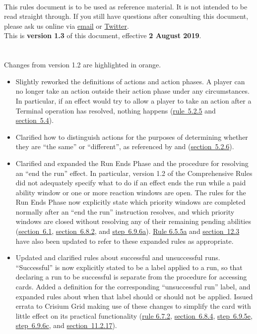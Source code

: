 \newcommand{\HRule}{\rule{\linewidth}{0.2mm}} %

\begin{titlepage}
\\[10pt]
This rules document is to be used as reference material. It is not intended to be read straight through. If you still have questions after consulting this document, please ask us online via \href{mailto:rules@nisei.net}{email} or \href{https://twitter.com/NISEI_Rules}{Twitter}.\\[10pt]
This is \textbf{version 1.3} of this document, effective \textbf{2 August 2019}.\\\\
\\[10pt]
Changes from version 1.2 are \textcolor{Bittersweet}{highlighted in orange}.
\begin{itemize}
	\item Slightly reworked the definitions of actions and action phases. A player can no longer take an action outside their action phase under any circumstances. In particular, if an effect would try to allow a player	to take an action after a Terminal operation has resolved, nothing happens (\hyperlink{page.i}{rule~5.2.5} and \hyperlink{page.i}{section~5.4}).
	\item Clarified how to distinguish actions for the purposes of determining whether they are ``the same'' or ``different'', as referenced by  and  (\hyperlink{page.i}{section~5.2.6}).
	\item Clarified and expanded the Run Ends Phase and the procedure for resolving an ``end the run'' effect. In	particular, version 1.2 of the Comprehensive Rules did not adequately specify what to do if an effect
	ends the run while a paid ability window or one or more reaction windows are open. The rules for the Run Ends Phase now explicitly state which priority windows are completed normally after an ``end the run'' instruction resolves, and which priority windows are closed without resolving any of their remaining pending abilities (\hyperlink{page.i}{section~6.1}, \hyperlink{page.i}{section~6.8.2}, and \hyperlink{page.i}{step~6.9.6a}). \hyperlink{page.i}{Rule 6.5.5a} and \hyperlink{page.i}{section~12.3} have also been updated to refer to these expanded rules as appropriate.
	\item Updated and clarified rules about successful and unsuccessful runs. ``Successful'' is now explicitly stated to be a label applied to a run, so that declaring a run to be successful is separate from the procedure for accessing cards. Added a definition for the corresponding ``unsuccessful run'' label, and	expanded rules about when that label should or should not be applied. Issued errata to Crisium Grid	making use of these changes to simplify the card with little effect on its practical functionality (\hyperlink{page.i}{rule 6.7.2}, \hyperlink{page.i}{section~6.8.4}, \hyperlink{page.i}{step~6.9.5e}, \hyperlink{page.i}{step~6.9.6c}, and \hyperlink{page.i}{section~11.2.17}).

\end{itemize}
\end{titlepage}
